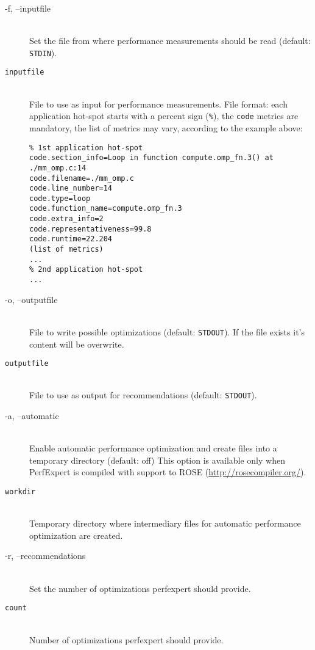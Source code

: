 \begin{description}
	\item[\btt -f, --inputfile]\hfill \\
	Set the file from where performance measurements should be read (default: \texttt{STDIN}).

	\item[\tt inputfile]\hfill \\
	File to use as input for performance measurements. File format: each application hot-spot starts with a percent sign (\texttt{\%}), the \texttt{code} metrics are mandatory, the list of metrics may vary, according to the example above:
	\begin{verbatim}
% 1st application hot-spot
code.section_info=Loop in function compute.omp_fn.3() at ./mm_omp.c:14
code.filename=./mm_omp.c
code.line_number=14
code.type=loop
code.function_name=compute.omp_fn.3
code.extra_info=2
code.representativeness=99.8
code.runtime=22.204
(list of metrics)
...
% 2nd application hot-spot
...
	\end{verbatim}

	\item[\btt -o, --outputfile]\hfill \\
	File to write possible optimizations (default: \texttt{STDOUT}). If the file exists it's content will be overwrite.

	\item[\tt outputfile]\hfill \\
	File to use as output for recommendations (default: \texttt{STDOUT}).

	\item[\btt -a, --automatic]\hfill \\
	Enable automatic performance optimization and create files into a temporary directory (default: off) This option is available only when PerfExpert is compiled with support to ROSE (\url{http://rosecompiler.org/}).

	\item[\tt workdir]\hfill \\
	Temporary directory where intermediary files for automatic performance optimization are created.

	\item[\btt -r, --recommendations]\hfill \\
	Set the number of optimizations perfexpert should provide.

	\item[\tt count]\hfill \\
	Number of optimizations perfexpert should provide.


\end{description}
